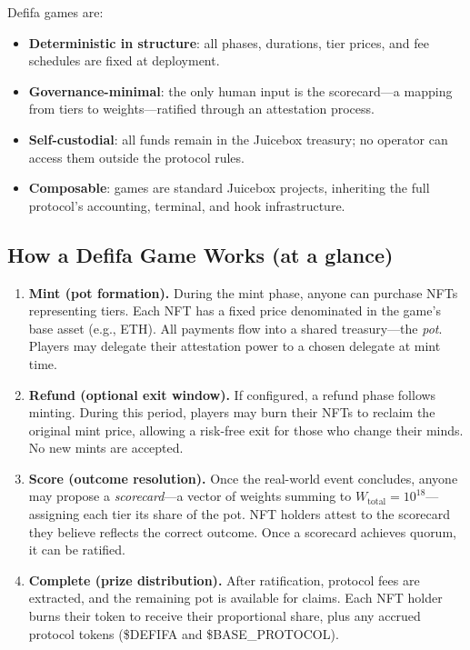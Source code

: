 \documentclass[11pt,a4paper]{article}
\begin{document}
Defifa games are:
\begin{itemize}[nosep]
    \item \textbf{Deterministic in structure}: all phases, durations, tier prices, and fee schedules are fixed at deployment.
    \item \textbf{Governance-minimal}: the only human input is the scorecard---a mapping from tiers to weights---ratified through an attestation process.
    \item \textbf{Self-custodial}: all funds remain in the Juicebox treasury; no operator can access them outside the protocol rules.
    \item \textbf{Composable}: games are standard Juicebox projects, inheriting the full protocol's accounting, terminal, and hook infrastructure.
\end{itemize}

\subsection{How a Defifa Game Works (at a glance)}

\begin{enumerate}[nosep]
    \item \textbf{Mint (pot formation).} During the mint phase, anyone can purchase NFTs representing tiers. Each NFT has a fixed price denominated in the game's base asset (e.g., ETH). All payments flow into a shared treasury---the \emph{pot}. Players may delegate their attestation power to a chosen delegate at mint time.

    \item \textbf{Refund (optional exit window).} If configured, a refund phase follows minting. During this period, players may burn their NFTs to reclaim the original mint price, allowing a risk-free exit for those who change their minds. No new mints are accepted.

    \item \textbf{Score (outcome resolution).} Once the real-world event concludes, anyone may propose a \emph{scorecard}---a vector of weights summing to $W_{\text{total}} = 10^{18}$---assigning each tier its share of the pot. NFT holders attest to the scorecard they believe reflects the correct outcome. Once a scorecard achieves quorum, it can be ratified.

    \item \textbf{Complete (prize distribution).} After ratification, protocol fees are extracted, and the remaining pot is available for claims. Each NFT holder burns their token to receive their proportional share, plus any accrued protocol tokens (\$DEFIFA and \$BASE\_\allowbreak{}PROTOCOL).
\end{enumerate}
\end{document}
